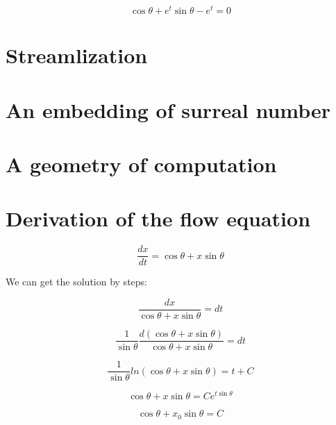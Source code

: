 \documentclass{article}
\begin{document}
\begin{equation}
     \cos \theta + e^t \sin \theta - e^t = 0
\end{equation}

\section{Streamlization}\label{sec:soada}

\section{An embedding of surreal number}\label{sec:aeosn}

\section{A geometry of computation}\label{sec:gioc}




\appendix

\section{Derivation of the flow equation}

\begin{equation}
    \frac{dx}{dt} = \cos \theta + x \sin \theta
\end{equation}

We can get the solution by steps:

\begin{equation}
    \frac{dx}{\cos \theta + x \sin \theta} = dt
\end{equation}

\begin{equation}
    \frac{1}{\sin \theta} \frac{d(\cos \theta + x \sin \theta)}{\cos \theta + x \sin \theta} = dt
\end{equation}

\begin{equation}
    \frac{1}{\sin \theta} ln(\cos \theta + x \sin \theta) = t + C
\end{equation}

\begin{equation}
    \cos \theta + x \sin \theta = C e^{t \sin \theta}
\end{equation}

\begin{equation}
    \cos \theta + x_0 \sin \theta = C
\end{equation}
\end{document}
